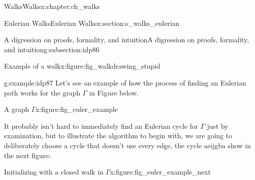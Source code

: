 \documentclass[oneside,10pt,]{book}
\numberwithin{equation}{section}
\begin{document}
\begin{chapterptx}{Walks}{}{Walks}{}{}{x:chapter:ch_walks}
\begin{sectionptx}{Eulerian Walks}{}{Eulerian Walks}{}{}{x:section:s_walks_eulerian}
\begin{subsectionptx}{A digression on proofs, formality, and intuition}{}{A digression on proofs, formality, and intuition}{}{}{g:subsection:idp86}
\begin{figureptx}{Example of a walk}{x:figure:fig_walkdrawing_stupid}{}
\begin{image}{0.15}{0.7}{0.15}
{
}%
\end{image}%
\tcblower
\end{figureptx}%
\begin{example}{}{g:example:idp87}%
Let's see an example of how the process of finding an Eulerian path works for the graph \(\Gamma\) in Figure below.%
\begin{figureptx}{A graph \(\Gamma\)}{x:figure:fig_euler_example}{}%
\begin{image}{0.15}{0.7}{0.15}%
%
\end{image}%
\tcblower
\end{figureptx}%
It probably isn't hard to immediately find an Eulerian cycle for \(\Gamma\) just by examination, but to illustrate the algorithm to begin with, we are going to deliberately choose a cycle that doesn't use every edge, the cycle aeijgba show in the next figure:%
\begin{figureptx}{Initializing with a closed walk in \(\Gamma\)}{x:figure:fig_euler_example_next}{}%
\begin{image}{0.15}{0.7}{0.15}%
\end{image}
\end{figureptx}
\end{example}
\end{subsectionptx}
\end{sectionptx}
\end{chapterptx}
\end{document}
